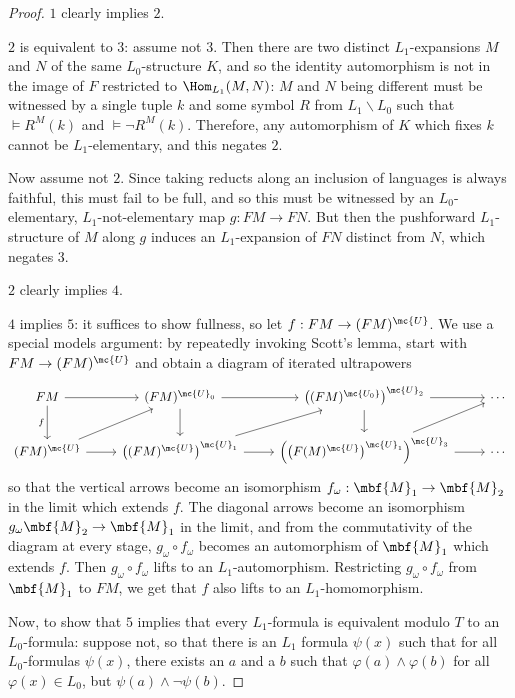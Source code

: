 \begin{proof}
\(1\) clearly implies \(2\).

\(2\) is equivalent to \(3\): assume not \(3\). Then there are two distinct \(L_1\)-expansions \(M\) and \(N\) of the same \(L_0\)-structure \(K\), and so the identity automorphism is not in the image of $F $ restricted to \(\Hom_{L_1}(M, N)\): \(M\) and \(N\) being different must be witnessed by a single tuple \(k\) and some symbol \(R\) from \(L_1 \backslash L_0\) such that \(\models R^M(k)\) and \(\models \neg R^M(k)\). Therefore, any automorphism of \(K\) which fixes \(k\) cannot be \(L_1\)-elementary, and this negates \(2\).

Now assume not \(2\). Since taking reducts along an inclusion of languages is always faithful, this must fail to be full, and so this must be witnessed by an \(L_0\)-elementary, \(L_1\)-not-elementary map \(g : F M \to F N\). But then the pushforward \(L_1\)-structure of \(M\) along \(g\) induces an \(L_1\)-expansion of \(F N\) distinct from \(N\), which negates \(3\).

\(2\) clearly implies \(4\).

\(4\) implies \(5\): it suffices to show fullness, so let \(f : FM \to (FM)^{\mc{U}}\). We use a special models argument: by repeatedly invoking Scott's lemma, start with $FM \to (FM)^{\mc{U}}$ and obtain a diagram of iterated ultrapowers
$$
\begin{tikzcd}[ampersand replacement = \&]
FM \arrow[swap]{d}{f}  \arrow{r} \& (FM)^{\mc{U}_0} \arrow{d} \arrow{r} \& \left((FM)^{\mc{U_0}} \right)^{\mc{U}_2}\arrow{d} \arrow{r}\& \cdots\\
(FM)^{\mc{U}} \arrow{r} \arrow{ur}  \& \left((FM)^{\mc{U}} \right)^{\mc{U}_1} \arrow{r} \arrow{ur}\&  \left( \left(F(M)^{\mc{U}} \right)^{\mc{U}_1} \right)^{\mc{U}_3} \arrow{r} \arrow{ur}\& \cdots
  \end{tikzcd}
  $$
so that the vertical arrows become an isomorphism $f_{\omega} : \mbf{M}_1 \to \mbf{M}_2$ in the limit which extends $f$. The diagonal arrows become an isomorphism $g_{\omega} \mbf{M}_2 \to \mbf{M}_1$ in the limit, and from the commutativity of the diagram at every stage, $g_{\omega} \circ f_{\omega}$ becomes an automorphism of $\mbf{M}_1$ which extends $f$. Then $g_{\omega} \circ f_{\omega}$ lifts to an $L_1$-automorphism. Restricting $g_{\omega} \circ f_{\omega}$ from $\mbf{M}_1$ to $FM$, we get that $f$ also lifts to an $L_1$-homomorphism.

Now, to show that \(5\) implies that every \(L_1\)-formula is equivalent modulo \(T\) to an \(L_0\)-formula: suppose not, so that there is an \(L_1\) formula \(\psi(x)\) such that for all \(L_0\)-formulas \(\psi(x)\), there exists an \(a\) and a \(b\) such that \(\varphi(a) \land \varphi(b)\) for all \(\varphi(x) \in L_0\), but \(\psi(a) \land \neg \psi(b)\).


\end{proof}
